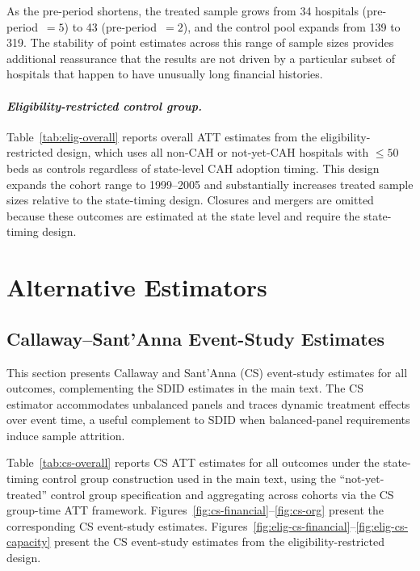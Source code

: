 \documentclass[a4paper, 12pt]{article}
\begin{document}
As the pre-period shortens, the treated sample grows from 34 hospitals (pre-period~$=5$) to 43 (pre-period~$=2$), and the control pool expands from 139 to 319. The stability of point estimates across this range of sample sizes provides additional reassurance that the results are not driven by a particular subset of hospitals that happen to have unusually long financial histories.

\paragraph{\textit{Eligibility-restricted control group.}}
Table~\ref{tab:elig-overall} reports overall ATT estimates from the eligibility-restricted design, which uses all non-CAH or not-yet-CAH hospitals with $\leq 50$ beds as controls regardless of state-level CAH adoption timing. This design expands the cohort range to 1999--2005 and substantially increases treated sample sizes relative to the state-timing design. Closures and mergers are omitted because these outcomes are estimated at the state level and require the state-timing design.



\section{Alternative Estimators}
\label{sec:app-alt}

\subsection{Callaway--Sant'Anna Event-Study Estimates}

This section presents Callaway and Sant'Anna (CS) event-study estimates for all outcomes, complementing the SDID estimates in the main text. The CS estimator accommodates unbalanced panels and traces dynamic treatment effects over event time, a useful complement to SDID when balanced-panel requirements induce sample attrition.

Table~\ref{tab:cs-overall} reports CS ATT estimates for all outcomes under the state-timing control group construction used in the main text, using the ``not-yet-treated'' control group specification and aggregating across cohorts via the CS group-time ATT framework. Figures~\ref{fig:cs-financial}--\ref{fig:cs-org} present the corresponding CS event-study estimates. Figures~\ref{fig:elig-cs-financial}--\ref{fig:elig-cs-capacity} present the CS event-study estimates from the eligibility-restricted design.
\end{document}
